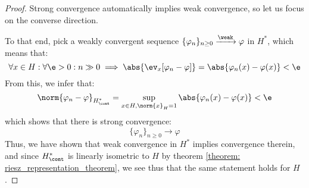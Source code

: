             \begin{proof}
                Strong convergence automatically implies weak convergence, so let us focus on the converse direction.
            
                To that end, pick a weakly convergent sequence $\{\varphi_n\}_{n \geq 0} \xrightarrow[]{\weak} \varphi$ in $H^*$, which means that:
                    $$\forall x \in H: \forall \e > 0: n \gg 0 \implies \abs{\ev_x[\varphi_n - \varphi]} = \abs{\varphi_n(x) - \varphi(x)} < \e$$
                From this, we infer that:
                    $$\norm{ \varphi_n - \varphi }_{H^*_{\cont}} = \sup_{x \in H, \norm{x}_H = 1} \abs{\varphi_n(x) - \varphi(x)} < \e$$
                which shows that there is strong convergence:
                    $$\{\varphi_n\}_{n \geq 0} \to \varphi$$
                Thus, we have shown that weak convergence in $H^*$ implies convergence therein, and since $H^*_{\cont}$ is linearly isometric to $H$ by theorem \ref{theorem: riesz_representation_theorem}, we see thus that the same statement holds for $H$.
            \end{proof}

